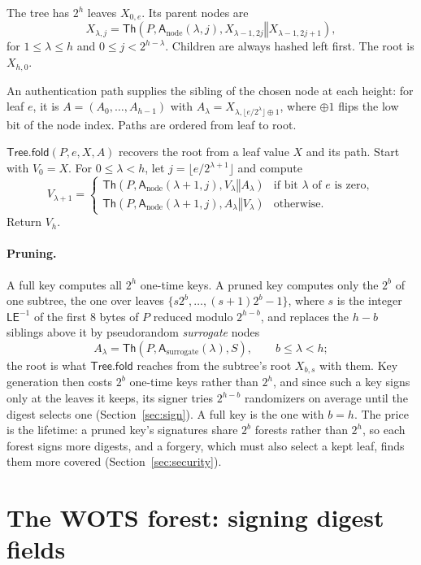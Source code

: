 \documentclass[11pt]{article}
\theoremstyle{plain}
\theoremstyle{definition}
\newcommand{\Th}{\mathsf{Th}}
\newcommand{\LE}{\mathsf{LE}}
\newcommand{\concat}{\mathbin\Vert}
\newcommand{\addr}{\mathsf{A}}
\newcommand{\TreeFold}{\mathsf{Tree.fold}}
\begin{document}
The tree has $2^h$ leaves $X_{0,e}$. Its parent nodes are
\[
  X_{\lambda,j}=\Th\!\left(P,\addr_{\mathrm{node}}(\lambda,j),X_{\lambda-1,2j}\concat X_{\lambda-1,2j+1}\right),
\]
for $1\leq\lambda\leq h$ and $0\leq j<2^{h-\lambda}$. Children are always hashed left first. The root is $X_{h,0}$.

An authentication path supplies the sibling of the chosen node at each height: for leaf $e$, it is $A=(A_0,\ldots,A_{h-1})$ with $A_\lambda=X_{\lambda,\lfloor e/2^\lambda\rfloor\oplus1}$, where $\oplus1$ flips the low bit of the node index. Paths are ordered from leaf to root.

$\TreeFold(P,e,X,A)$ recovers the root from a leaf value $X$ and its path. Start with $V_0=X$. For $0\leq\lambda<h$, let $j=\lfloor e/2^{\lambda+1}\rfloor$ and compute
\[
  V_{\lambda+1}=\begin{cases}
    \Th\!\left(P,\addr_{\mathrm{node}}(\lambda+1,j),V_\lambda\concat A_\lambda\right)
      &\text{if bit $\lambda$ of $e$ is zero},\\[2pt]
    \Th\!\left(P,\addr_{\mathrm{node}}(\lambda+1,j),A_\lambda\concat V_\lambda\right)
      &\text{otherwise}.
  \end{cases}
\]
Return $V_h$.

\paragraph{Pruning.}
\label{sec:pruning}
A full key computes all $2^h$ one-time keys. A pruned key computes only the $2^b$ of one subtree, the one over leaves $\{s2^b,\ldots,(s+1)2^b-1\}$, where $s$ is the integer $\LE^{-1}$ of the first 8 bytes of $P$ reduced modulo $2^{h-b}$, and replaces the $h-b$ siblings above it by pseudorandom \emph{surrogate} nodes
\[
  A_\lambda=\Th\!\left(P,\addr_{\mathrm{surrogate}}(\lambda),S\right),\qquad b\leq\lambda<h;
\]
the root is what $\TreeFold$ reaches from the subtree's root $X_{b,s}$ with them. Key generation then costs $2^b$ one-time keys rather than $2^h$, and since such a key signs only at the leaves it keeps, its signer tries $2^{h-b}$ randomizers on average until the digest selects one (Section~\ref{sec:sign}). A full key is the one with $b=h$. The price is the lifetime: a pruned key's signatures share $2^b$ forests rather than $2^h$, so each forest signs more digests, and a forgery, which must also select a kept leaf, finds them more covered (Section~\ref{sec:security}).

\section{The WOTS forest: signing digest fields}
\label{sec:fts}
\end{document}
